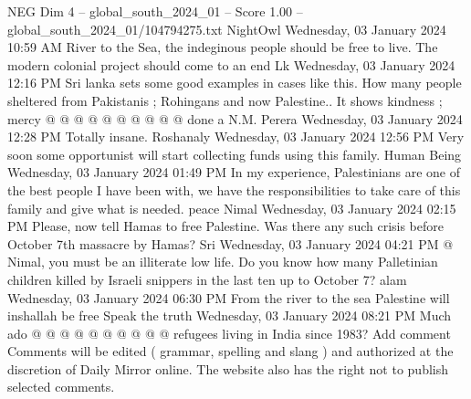 \begin{textsample}{NEG Dim 4 – global\_south\_2024\_01 – Score 1.00 – global\_south\_2024\_01/104794275.txt}
NightOwl Wednesday, 03 January 2024 10:59 AM River to the Sea, the indeginous people should be free to live.
The modern colonial project should come to an end Lk Wednesday, 03 January 2024 12:16 PM Sri lanka sets some good examples in cases like this.
How many people sheltered from Pakistanis ; Rohingans and now Palestine..
It shows kindness ; mercy @ @ @ @ @ @ @ @ @ @ done a N.M.
Perera Wednesday, 03 January 2024 12:28 PM Totally insane.
Roshanaly Wednesday, 03 January 2024 12:56 PM Very soon some opportunist will start collecting funds using this family.
Human Being Wednesday, 03 January 2024 01:49 PM In my experience, Palestinians are one of the best people I have been with, we have the responsibilities to take care of this family and give what is needed. peace Nimal Wednesday, 03 January 2024 02:15 PM Please, now tell Hamas to free Palestine.
Was there any such crisis before October 7th massacre by Hamas?
Sri Wednesday, 03 January 2024 04:21 PM @ Nimal, you must be an illiterate low life.
Do you know how many Palletinian children killed by Israeli snippers in the last ten up to October 7? alam Wednesday, 03 January 2024 06:30 PM From the river to the sea Palestine will inshallah be free Speak the truth Wednesday, 03 January 2024 08:21 PM Much ado @ @ @ @ @ @ @ @ @ @ refugees living in India since 1983?
Add comment Comments will be edited ( grammar, spelling and slang ) and authorized at the discretion of Daily Mirror online.
The website also has the right not to publish selected comments.

\end{textsample}
